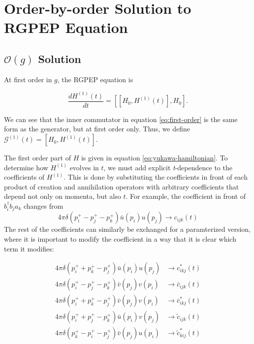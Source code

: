 \section{Order-by-order Solution to RGPEP Equation}
\subsection{$\mathcal{O}(g)$ Solution}
\label{sec:first-order}
At first order in $g$, the RGPEP equation is 

\begin{equation}
    \label{eq:first-order}
    \frac{dH^{(1)}(t)}{dt} = \left[\left[H_0, H^{(1)}(t) \right], H_0 \right].
\end{equation}

We can see that the inner commutator in equation \ref{eq:first-order} is the same form as the generator, but at first order only. 
Thus, we define $\mathcal{G}^{(1)}(t) = \left[H_0,  H^{(1)}(t)\right]$.

The first order part of $H$ is given in equation \ref{eq:yukawa-hamiltonian}.
To determine how $H^{(1)}$ evolves in $t$, we must add explicit \textit{t}-dependence to the coefficients of $H^{(1)}$.
This is done by substituting the coefficients in front of each product of creation and annihilation operators with arbitrary coefficients that depend not only on momenta, but also $t$. 
For example, the coefficient in front of $b_i^\dagger b_j a_k$ changes from $$4\pi \delta\left(p_i^+ - p_j^+ - p_k^+ \right)\bar u(p_i) u(p_j) \rightarrow c_{ijk}(t)$$  
The rest of the coefficients can similarly be exchanged for a paramterized version, where it is important to modify the coefficient in a way that it is clear which term it modifies:

\begin{align}\nonumber
    4\pi \delta\left(p_i^+ + p_k^+ - p_j^+ \right)\bar{u}(p_i) u(p_j) &\rightarrow c^*_{ikj}(t)\\ \nonumber
    4\pi \delta\left(p_i^+ - p_j^+ - p_k^+ \right)\bar{v}(p_j) v(p_i) &\rightarrow \bar{c}_{ijk}(t) \\ \nonumber
    4\pi \delta\left(p_i^+ + p_k^+ - p_j^+ \right)\bar{v}(p_j) v(p_i) &\rightarrow \bar c^*_{ikj}(t)\\ \nonumber
    4\pi \delta\left(p_i^+ + p_j^+ - p_k^+ \right)\bar{u}(p_i) v(p_j) &\rightarrow \tilde c_{ijk}(t)\\ \nonumber
    4\pi \delta\left( p_k^+ - p_i^+ - p_j^+ \right)\bar{v}(p_j) u(p_i) &\rightarrow \tilde c^*_{kij}(t)\\ \nonumber
\end{align}

